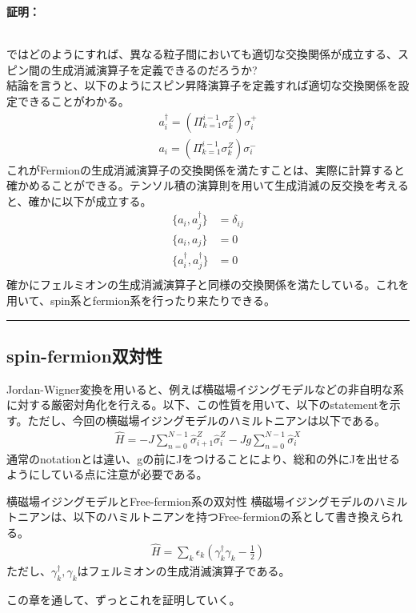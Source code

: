 \documentclass[a4paper,10.5pt]{article}
\numberwithin{equation}{section}
\newenvironment{proofbox}
{\begin{prooflabel}\textbf{証明：}\end{prooflabel}\vspace{0.8em}}
{\par\vspace{1em}\hrule\vspace{1em}}
\begin{document}
\begin{proofbox}
\\
ではどのようにすれば、異なる粒子間においても適切な交換関係が成立する、スピン間の生成消滅演算子を定義できるのだろうか?\\
結論を言うと、以下のようにスピン昇降演算子を定義すれば適切な交換関係を設定できることがわかる。
\begin{equation}\begin{split} \label{Jordan}
    a_{i}^{\dagger} = (\Pi_{k=1}^{i-1} \sigma_{k}^{Z} ) \sigma_{i}^{+}\\
    a_{i} = (\Pi_{k=1}^{i-1} \sigma_{k}^{Z} ) \sigma_{i}^{-}
\end{split} \end{equation}
これがFermionの生成消滅演算子の交換関係を満たすことは、実際に計算すると確かめることができる。テンソル積の演算則を用いて生成消滅の反交換を考えると、確かに以下が成立する。
\begin{equation}\begin{split}
    \{a_{i},a_{j}^{\dagger}\} &=\delta_{ij} \\
    \{a_{i},a_{j}\} &=0 \\
    \{a_{i}^{\dagger},a_{j}^{\dagger}\} &=0 \\
\end{split} \end{equation}
確かにフェルミオンの生成消滅演算子と同様の交換関係を満たしている。これを用いて、spin系とfermion系を行ったり来たりできる。
\end{proofbox}

\subsection{spin-fermion双対性}
Jordan-Wigner変換を用いると、例えば横磁場イジングモデルなどの非自明な系に対する厳密対角化を行える。以下、この性質を用いて、以下のstatementを示す。ただし、今回の横磁場イジングモデルのハミルトニアンは以下である。
\begin{equation}\begin{split}
    \hat{H}=-J\sum_{n=0}^{N-1}\hat{\sigma}_{i+1}^{Z} \hat{\sigma}_{i}^{Z} -Jg\sum_{n=0}^{N-1} \hat{\sigma}_{i}^{X}
\end{split} \end{equation}
通常のnotationとは違い、gの前にJをつけることにより、総和の外にJを出せるようにしている点に注意が必要である。
\begin{resultbox}{横磁場イジングモデルとFree-fermion系の双対性}
横磁場イジングモデルのハミルトニアンは、以下のハミルトニアンを持つFree-fermionの系として書き換えられる。
\begin{equation}\begin{split}
    \hat{H} = \sum_{k} \epsilon_{k}(\gamma^{\dagger}_{k} \gamma_{k}-\frac{1}{2})
\end{split} \end{equation}
ただし、$\gamma^{\dagger}_{k}, \gamma_{k}$はフェルミオンの生成消滅演算子である。
\end{resultbox}
この章を通して、ずっとこれを証明していく。
\end{document}
